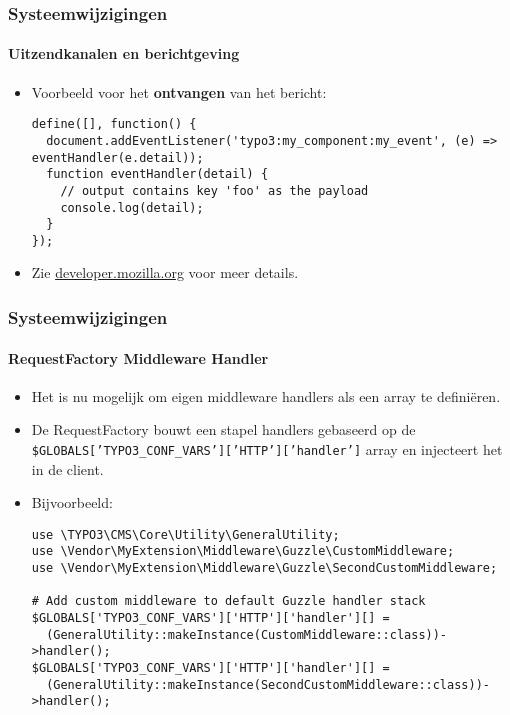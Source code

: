 
\begin{frame}[fragile]
	\frametitle{Systeemwijzigingen}
	\framesubtitle{Uitzendkanalen en berichtgeving}

	\lstset{basicstyle=\tiny\ttfamily}

	\begin{itemize}
		\item Voorbeeld voor het \textbf{ontvangen} van het bericht:
\begin{lstlisting}
define([], function() {
  document.addEventListener('typo3:my_component:my_event', (e) => eventHandler(e.detail));
  function eventHandler(detail) {
    // output contains key 'foo' as the payload
    console.log(detail);
  }
});
\end{lstlisting}

		\item Zie \href{https://developer.mozilla.org/en-US/docs/Web/API/Broadcast_Channel_API}{developer.mozilla.org} voor meer details.

	\end{itemize}

\end{frame}


\begin{frame}[fragile]
	\frametitle{Systeemwijzigingen}
	\framesubtitle{RequestFactory Middleware Handler}

	\lstset{basicstyle=\tiny\ttfamily}

	\begin{itemize}
		\item Het is nu mogelijk om eigen middleware handlers als een array te definiëren.
		\item De RequestFactory bouwt een stapel handlers gebaseerd op de\newline
			\small
				\texttt{\$GLOBALS['TYPO3\_CONF\_VARS']['HTTP']['handler']}
			\normalsize
			array en injecteert het in de client.
		\item Bijvoorbeeld:
\begin{lstlisting}
use \TYPO3\CMS\Core\Utility\GeneralUtility;
use \Vendor\MyExtension\Middleware\Guzzle\CustomMiddleware;
use \Vendor\MyExtension\Middleware\Guzzle\SecondCustomMiddleware;

# Add custom middleware to default Guzzle handler stack
$GLOBALS['TYPO3_CONF_VARS']['HTTP']['handler'][] =
  (GeneralUtility::makeInstance(CustomMiddleware::class))->handler();
$GLOBALS['TYPO3_CONF_VARS']['HTTP']['handler'][] =
  (GeneralUtility::makeInstance(SecondCustomMiddleware::class))->handler();
\end{lstlisting}

	\end{itemize}

\end{frame}

